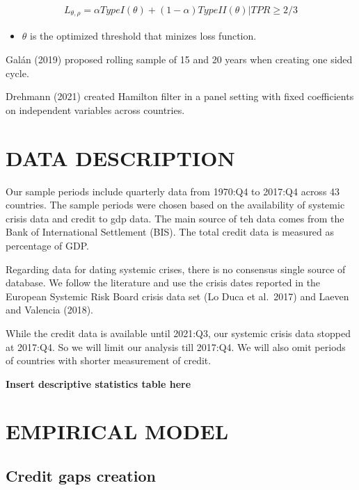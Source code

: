 \documentclass[
  12pt,
]{article}
\providecommand{\tightlist}{%
  \setlength{\itemsep}{0pt}\setlength{\parskip}{0pt}}
\begin{document}
\begin{align*}
L_{\theta,\rho}=\alpha TypeI(\theta)+(1-\alpha)TypeII(\theta)|TPR\ge2/3
\end{align*}

\begin{itemize}
\tightlist
\item
  \(\theta\) is the optimized threshold that minizes loss function.
\end{itemize}

Galán (2019) proposed rolling sample of 15 and 20 years when creating one sided cycle.

Drehmann (2021) created Hamilton filter in a panel setting with fixed coefficients on independent variables across countries.

\hypertarget{data-description}{%
\section{DATA DESCRIPTION}\label{data-description}}

Our sample periods include quarterly data from 1970:Q4 to 2017:Q4 across 43 countries. The sample periods were chosen
based on the availability of systemic crisis data and credit to gdp data. The main source of teh data
comes from the Bank of International Settlement (BIS). The total credit data is measured as percentage of GDP.

Regarding data for dating systemic crises, there is no consensus single source of database. We follow the literature and
use the crisis dates reported in the European Systemic Risk Board crisis data set (Lo Duca et al.~2017) and
Laeven and Valencia (2018).

While the credit data is available until 2021:Q3, our systemic crisis data stopped at 2017:Q4. So we will limit our analysis
till 2017:Q4. We will also omit periods of countries with shorter measurement of credit.

\textbf{Insert descriptive statistics table here}

\hypertarget{empirical-model}{%
\section{EMPIRICAL MODEL}\label{empirical-model}}

\hypertarget{credit-gaps-creation}{%
\subsection{Credit gaps creation}\label{credit-gaps-creation}}
\end{document}

